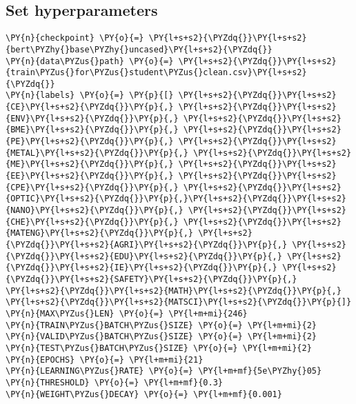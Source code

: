 \documentclass[../main.tex]{subfiles}
\begin{document}
    \subsection{Set hyperparameters}\label{set-hyperparameters}

    \begin{tcolorbox}[breakable, size=fbox, boxrule=1pt, pad at break*=1mm,colback=cellbackground, colframe=cellborder]
\begin{Verbatim}[commandchars=\\\{\}]
\PY{n}{checkpoint} \PY{o}{=} \PY{l+s+s2}{\PYZdq{}}\PY{l+s+s2}{bert\PYZhy{}base\PYZhy{}uncased}\PY{l+s+s2}{\PYZdq{}}
\PY{n}{data\PYZus{}path} \PY{o}{=} \PY{l+s+s2}{\PYZdq{}}\PY{l+s+s2}{train\PYZus{}for\PYZus{}student\PYZus{}clean.csv}\PY{l+s+s2}{\PYZdq{}}
\PY{n}{labels} \PY{o}{=} \PY{p}{[} \PY{l+s+s2}{\PYZdq{}}\PY{l+s+s2}{CE}\PY{l+s+s2}{\PYZdq{}}\PY{p}{,} \PY{l+s+s2}{\PYZdq{}}\PY{l+s+s2}{ENV}\PY{l+s+s2}{\PYZdq{}}\PY{p}{,} \PY{l+s+s2}{\PYZdq{}}\PY{l+s+s2}{BME}\PY{l+s+s2}{\PYZdq{}}\PY{p}{,} \PY{l+s+s2}{\PYZdq{}}\PY{l+s+s2}{PE}\PY{l+s+s2}{\PYZdq{}}\PY{p}{,} \PY{l+s+s2}{\PYZdq{}}\PY{l+s+s2}{METAL}\PY{l+s+s2}{\PYZdq{}}\PY{p}{,} \PY{l+s+s2}{\PYZdq{}}\PY{l+s+s2}{ME}\PY{l+s+s2}{\PYZdq{}}\PY{p}{,} \PY{l+s+s2}{\PYZdq{}}\PY{l+s+s2}{EE}\PY{l+s+s2}{\PYZdq{}}\PY{p}{,} \PY{l+s+s2}{\PYZdq{}}\PY{l+s+s2}{CPE}\PY{l+s+s2}{\PYZdq{}}\PY{p}{,} \PY{l+s+s2}{\PYZdq{}}\PY{l+s+s2}{OPTIC}\PY{l+s+s2}{\PYZdq{}}\PY{p}{,}\PY{l+s+s2}{\PYZdq{}}\PY{l+s+s2}{NANO}\PY{l+s+s2}{\PYZdq{}}\PY{p}{,} \PY{l+s+s2}{\PYZdq{}}\PY{l+s+s2}{CHE}\PY{l+s+s2}{\PYZdq{}}\PY{p}{,} \PY{l+s+s2}{\PYZdq{}}\PY{l+s+s2}{MATENG}\PY{l+s+s2}{\PYZdq{}}\PY{p}{,} \PY{l+s+s2}{\PYZdq{}}\PY{l+s+s2}{AGRI}\PY{l+s+s2}{\PYZdq{}}\PY{p}{,} \PY{l+s+s2}{\PYZdq{}}\PY{l+s+s2}{EDU}\PY{l+s+s2}{\PYZdq{}}\PY{p}{,} \PY{l+s+s2}{\PYZdq{}}\PY{l+s+s2}{IE}\PY{l+s+s2}{\PYZdq{}}\PY{p}{,} \PY{l+s+s2}{\PYZdq{}}\PY{l+s+s2}{SAFETY}\PY{l+s+s2}{\PYZdq{}}\PY{p}{,} \PY{l+s+s2}{\PYZdq{}}\PY{l+s+s2}{MATH}\PY{l+s+s2}{\PYZdq{}}\PY{p}{,} \PY{l+s+s2}{\PYZdq{}}\PY{l+s+s2}{MATSCI}\PY{l+s+s2}{\PYZdq{}}\PY{p}{]}
\PY{n}{MAX\PYZus{}LEN} \PY{o}{=} \PY{l+m+mi}{246}
\PY{n}{TRAIN\PYZus{}BATCH\PYZus{}SIZE} \PY{o}{=} \PY{l+m+mi}{2}
\PY{n}{VALID\PYZus{}BATCH\PYZus{}SIZE} \PY{o}{=} \PY{l+m+mi}{2}
\PY{n}{TEST\PYZus{}BATCH\PYZus{}SIZE} \PY{o}{=} \PY{l+m+mi}{2}
\PY{n}{EPOCHS} \PY{o}{=} \PY{l+m+mi}{21}
\PY{n}{LEARNING\PYZus{}RATE} \PY{o}{=} \PY{l+m+mf}{5e\PYZhy{}05}
\PY{n}{THRESHOLD} \PY{o}{=} \PY{l+m+mf}{0.3}
\PY{n}{WEIGHT\PYZus{}DECAY} \PY{o}{=} \PY{l+m+mf}{0.001}
\end{Verbatim}
\end{tcolorbox}
\end{document}
